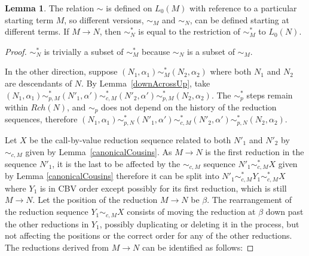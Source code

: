 \documentclass{article}
\theoremstyle{definition}
\theoremstyle{lemma}
\newtheorem{lemma}{Lemma}
\theoremstyle{remark}
\begin{document}
\begin{lemma}
\label{lem:sim-M-N}
The relation $\sim$ is defined on $L_0(M)$ with reference to a particular starting term $M$, so different versions, $\sim_M$ and $\sim_N$, can be defined starting at different terms. If $M \to N$, then $\sim^*_N$ is equal to the restriction of $\sim^*_M$ to $L_0(N)$.
\end{lemma} 

\begin{proof}
$\sim_N^*$ is trivially a subset of $\sim_M^*$ because $\sim_N$ is a subset of $\sim_M$.

In the other direction, suppose $(N_1, \alpha_1) \sim_M^* (N_2, \alpha_2)$ where both $N_1$ and $N_2$ are descendants of $N$. By Lemma~\ref{downAcrossUp}, take $(N_1, \alpha_1) \sim_{p,M}^* (N'_1, \alpha') \sim_{c,M}^* (N'_2, \alpha') \sim_{p,M}^* (N_2, \alpha_2)$. 
The $\sim_p^*$ steps remain within $Rch(N)$, and $\sim_p$ does not depend on the history of the reduction sequences, therefore $(N_1, \alpha_1) \sim_{p,N}^* (N'_1, \alpha') \sim_{c,M}^* (N'_2, \alpha') \sim_{p,N}^* (N_2, \alpha_2)$.

Let $X$ be the call-by-value reduction sequence related to both $N'_1$ and $N'_2$ by $\sim_{c,M}$ given by Lemma~\ref{canonicalCousins}. 
As $M \to N$ is the first reduction in the sequence $N'_1$, it is the last to be affected by the $\sim_{c,M}$ sequence $N'_1 \sim_{c,M}^* X$ given by Lemma \ref{canonicalCousins} therefore it can be split into $N'_1 \sim_{c,M}^* Y_1 \sim_{c,M}^* X$ where $Y_1$ is in CBV order except possibly for its first reduction, which is still $M \to N$. Let the position of the reduction $M \to N$ be $\beta$. 
The rearrangement of the reduction sequence $Y_1 \sim_{c,M} X$ consists of moving the reduction at $\beta$ down past the other reductions in $Y_1$, possibly duplicating or deleting it in the process, but not affecting the positions or the correct order for any of the other reductions. 
The reductions derived from $M \to N$ can be identified as follows:


\end{proof}
\end{document}
